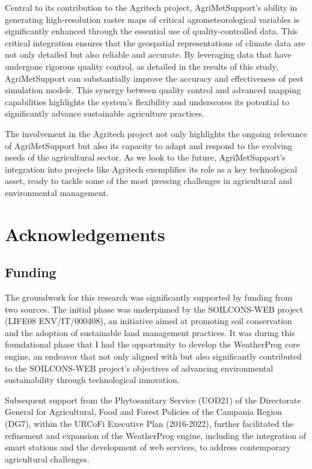 \documentclass[authoryear,preprint,review,12pt]{elsarticle}
\begin{document}
Central to its contribution to the Agritech project, AgriMetSupport's ability in generating high-resolution raster maps of critical agrometeorological variables is significantly enhanced through the essential use of quality-controlled data.
This critical integration ensures that the geospatial representations of climate data are not only detailed but also reliable and accurate. 
By leveraging data that have undergone rigorous quality control, as detailed in the results of this study, AgriMetSupport can substantially improve the accuracy and effectiveness of pest simulation models. 
This synergy between quality control and advanced mapping capabilities highlights the system's flexibility and underscores its potential to significantly advance sustainable agriculture practices.

The involvement in the Agritech project not only highlights the ongoing relevance of AgriMetSupport but also its capacity to adapt and respond to the evolving needs of the agricultural sector. 
As we look to the future, AgriMetSupport's integration into projects like Agritech exemplifies its role as a key technological asset, ready to tackle some of the most pressing challenges in agricultural and environmental management.

\section*{Acknowledgements}
\subsection*{Funding}
The groundwork for this research was significantly supported by funding from two sources. 
The initial phase was underpinned by the SOILCONS-WEB project (LIFE08 ENV/IT/000408), an initiative aimed at promoting soil conservation and the adoption of sustainable land management practices. 
It was during this foundational phase that I had the opportunity to develop the WeatherProg core engine, an endeavor that not only aligned with but also significantly contributed to the SOILCONS-WEB project's objectives of advancing environmental sustainability through technological innovation.

Subsequent support from the Phytosanitary Service (UOD21) of the Directorate General for Agricultural, Food and Forest Policies of the Campania Region (DG7), within the URCoFi Executive Plan (2016-2022), further facilitated the refinement and expansion of the WeatherProg engine, including the integration of smart stations and the development of web services, to address contemporary agricultural challenges.
\end{document}
